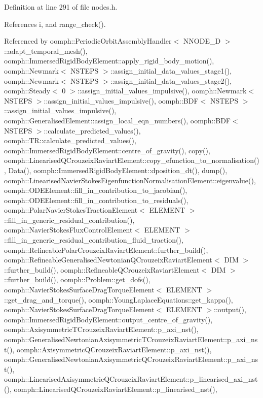 Definition at line 291 of file nodes.\+h.



References i, and range\+\_\+check().



Referenced by oomph\+::\+Periodic\+Orbit\+Assembly\+Handler$<$ N\+N\+O\+D\+E\+\_\+D $>$\+::adapt\+\_\+temporal\+\_\+mesh(), oomph\+::\+Immersed\+Rigid\+Body\+Element\+::apply\+\_\+rigid\+\_\+body\+\_\+motion(), oomph\+::\+Newmark$<$ N\+S\+T\+E\+P\+S $>$\+::assign\+\_\+initial\+\_\+data\+\_\+values\+\_\+stage1(), oomph\+::\+Newmark$<$ N\+S\+T\+E\+P\+S $>$\+::assign\+\_\+initial\+\_\+data\+\_\+values\+\_\+stage2(), oomph\+::\+Steady$<$ 0 $>$\+::assign\+\_\+initial\+\_\+values\+\_\+impulsive(), oomph\+::\+Newmark$<$ N\+S\+T\+E\+P\+S $>$\+::assign\+\_\+initial\+\_\+values\+\_\+impulsive(), oomph\+::\+B\+D\+F$<$ N\+S\+T\+E\+P\+S $>$\+::assign\+\_\+initial\+\_\+values\+\_\+impulsive(), oomph\+::\+Generalised\+Element\+::assign\+\_\+local\+\_\+eqn\+\_\+numbers(), oomph\+::\+B\+D\+F$<$ N\+S\+T\+E\+P\+S $>$\+::calculate\+\_\+predicted\+\_\+values(), oomph\+::\+T\+R\+::calculate\+\_\+predicted\+\_\+values(), oomph\+::\+Immersed\+Rigid\+Body\+Element\+::centre\+\_\+of\+\_\+gravity(), copy(), oomph\+::\+Linearised\+Q\+Crouzeix\+Raviart\+Element\+::copy\+\_\+efunction\+\_\+to\+\_\+normalisation(), Data(), oomph\+::\+Immersed\+Rigid\+Body\+Element\+::dposition\+\_\+dt(), dump(), oomph\+::\+Linearised\+Navier\+Stokes\+Eigenfunction\+Normalisation\+Element\+::eigenvalue(), oomph\+::\+O\+D\+E\+Element\+::fill\+\_\+in\+\_\+contribution\+\_\+to\+\_\+jacobian(), oomph\+::\+O\+D\+E\+Element\+::fill\+\_\+in\+\_\+contribution\+\_\+to\+\_\+residuals(), oomph\+::\+Polar\+Navier\+Stokes\+Traction\+Element$<$ E\+L\+E\+M\+E\+N\+T $>$\+::fill\+\_\+in\+\_\+generic\+\_\+residual\+\_\+contribution(), oomph\+::\+Navier\+Stokes\+Flux\+Control\+Element$<$ E\+L\+E\+M\+E\+N\+T $>$\+::fill\+\_\+in\+\_\+generic\+\_\+residual\+\_\+contribution\+\_\+fluid\+\_\+traction(), oomph\+::\+Refineable\+Polar\+Crouzeix\+Raviart\+Element\+::further\+\_\+build(), oomph\+::\+Refineable\+Generalised\+Newtonian\+Q\+Crouzeix\+Raviart\+Element$<$ D\+I\+M $>$\+::further\+\_\+build(), oomph\+::\+Refineable\+Q\+Crouzeix\+Raviart\+Element$<$ D\+I\+M $>$\+::further\+\_\+build(), oomph\+::\+Problem\+::get\+\_\+dofs(), oomph\+::\+Navier\+Stokes\+Surface\+Drag\+Torque\+Element$<$ E\+L\+E\+M\+E\+N\+T $>$\+::get\+\_\+drag\+\_\+and\+\_\+torque(), oomph\+::\+Young\+Laplace\+Equations\+::get\+\_\+kappa(), oomph\+::\+Navier\+Stokes\+Surface\+Drag\+Torque\+Element$<$ E\+L\+E\+M\+E\+N\+T $>$\+::output(), oomph\+::\+Immersed\+Rigid\+Body\+Element\+::output\+\_\+centre\+\_\+of\+\_\+gravity(), oomph\+::\+Axisymmetric\+T\+Crouzeix\+Raviart\+Element\+::p\+\_\+axi\+\_\+nst(), oomph\+::\+Generalised\+Newtonian\+Axisymmetric\+T\+Crouzeix\+Raviart\+Element\+::p\+\_\+axi\+\_\+nst(), oomph\+::\+Axisymmetric\+Q\+Crouzeix\+Raviart\+Element\+::p\+\_\+axi\+\_\+nst(), oomph\+::\+Generalised\+Newtonian\+Axisymmetric\+Q\+Crouzeix\+Raviart\+Element\+::p\+\_\+axi\+\_\+nst(), oomph\+::\+Linearised\+Axisymmetric\+Q\+Crouzeix\+Raviart\+Element\+::p\+\_\+linearised\+\_\+axi\+\_\+nst(), oomph\+::\+Linearised\+Q\+Crouzeix\+Raviart\+Element\+::p\+\_\+linearised\+\_\+nst(), 